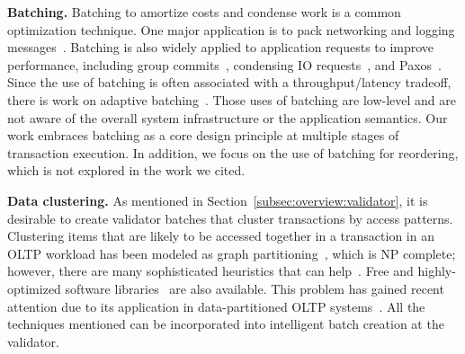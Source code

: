 {\bf Batching.}
Batching to amortize costs and condense work is a common optimization technique. One major application is to pack networking and logging messages~\cite{castro2002practical,glendenning2011scalable, friedman1997packing, ding2015centiman}. Batching is also widely applied to application requests to improve performance, including group commits~\cite{hagmann1987reimplementing, debrabant2013anti}, condensing IO requests~\cite{debrabant2013anti, faleiro2014lazy}, and Paxos~\cite{santos2012tuning}.
Since the use of batching is often associated with a throughput/latency tradeoff, there is work on adaptive batching~\cite{friedman2006adaptive, nagle1984congestion}.
Those uses of batching are low-level and are not aware of the overall system infrastructure or the application semantics. Our work embraces batching as a core design principle at multiple stages of transaction execution. In addition, we focus on the use of batching for reordering, which is not explored in the work we cited.


{\bf Data clustering.}
As mentioned in Section~\ref{subsec:overview:validator}, it is desirable to create validator batches that cluster transactions by access patterns. Clustering items that are likely to be accessed together in a transaction in an OLTP workload has been modeled as graph partitioning~\cite{tsangaris1991stochastic}, which is NP complete; however, there are many sophisticated heuristics that can help~\cite{kernighan1970efficient, karypis1998fast, ding2001min}. Free and highly-optimized software libraries~\cite{karypis1995metis} are also available. 
This problem has gained recent attention due to its application in data-partitioned OLTP systems~\cite{pavlo2012skew}. All the techniques mentioned can be incorporated into intelligent batch creation at the validator.


